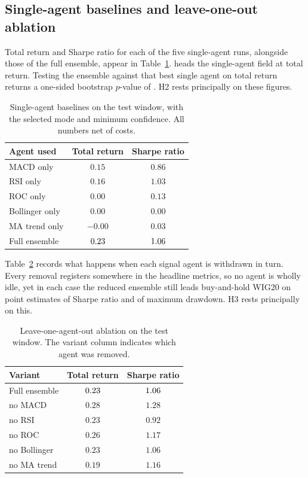 \subsection{Single-agent baselines and leave-one-out ablation}\label{subsec:ablation}

Total return and Sharpe ratio for each of the five single-agent runs, alongside those of the full ensemble, appear in Table~\ref{tab:single_agent}. \BestSingleName{} heads the single-agent field at \BestSingleTR{} total return. Testing the ensemble against that best single agent on total return returns a one-sided bootstrap $p$-value of \PvsBestSingle{}. H2 rests principally on these figures.

\begin{table}[!htbp]
\centering
\caption{Single-agent baselines on the test window, with the selected mode and minimum confidence. All numbers net of costs.}
\label{tab:single_agent}
\begin{tabular}{lcc}
\toprule
\textbf{Agent used} & \textbf{Total return} & \textbf{Sharpe ratio} \\
\midrule
MACD only        & $0.15$ & $0.86$ \\
RSI only         & $0.16$ & $1.03$ \\
ROC only         & $0.00$ & $0.13$ \\
Bollinger only   & $0.00$ & $0.00$ \\
MA trend only    & $-0.00$ & $0.03$ \\
Full ensemble    & $0.23$ & $1.06$ \\
\bottomrule
\end{tabular}
\end{table}

Table~\ref{tab:ablation} records what happens when each signal agent is withdrawn in turn. Every removal registers somewhere in the headline metrics, so no agent is wholly idle, yet in each case the reduced ensemble still leads buy-and-hold WIG20 on point estimates of Sharpe ratio and of maximum drawdown. H3 rests principally on this.

\begin{table}[!htbp]
\centering
\caption{Leave-one-agent-out ablation on the test window. The variant column indicates which agent was removed.}
\label{tab:ablation}
\begin{tabular}{lcc}
\toprule
\textbf{Variant} & \textbf{Total return} & \textbf{Sharpe ratio} \\
\midrule
Full ensemble & $0.23$ & $1.06$ \\
no MACD        & $0.28$ & $1.28$ \\
no RSI         & $0.23$ & $0.92$ \\
no ROC         & $0.26$ & $1.17$ \\
no Bollinger   & $0.23$ & $1.06$ \\
no MA trend    & $0.19$ & $1.16$ \\
\bottomrule
\end{tabular}
\end{table}

